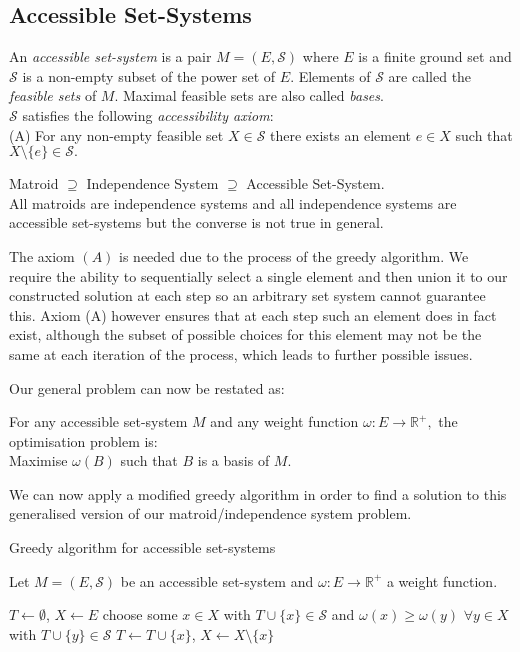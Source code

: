 \documentclass[../main.tex]{subfiles}
\begin{document}
\subsection{Accessible Set-Systems}
\begin{defn}
An \textit{accessible set-system} is a pair $M=(E,\mathcal{S})$ where $E$ is a finite ground set and $\mathcal{S}$ is a non-empty subset of the power set of $E.$ Elements of $\mathcal{S}$ are called the \textit{feasible sets} of $M.$ Maximal feasible sets are also called \textit{bases}.\\
$\mathcal{S}$ satisfies the following \textit{accessibility axiom}:\\
(A) For any non-empty feasible set $X \in \mathcal{S}$ there exists an element $e \in X$ such that $X \setminus \{e\} \in \mathcal{S}.$
\end{defn}

\begin{rem}
Matroid $\supseteq$ Independence System $\supseteq$ Accessible Set-System.\\
All matroids are independence systems and all independence systems are accessible set-systems but the converse is not true in general.
\end{rem}

\noindent The axiom $(A)$ is needed due to the process of the greedy algorithm. We require the ability to sequentially select a single element and then union it to our constructed solution at each step so an arbitrary set system cannot guarantee this. Axiom (A) however ensures that at each step such an element does in fact exist, although the subset of possible choices for this element may not be the same at each iteration of the process, which leads to further possible issues.

\noindent Our general problem can now be restated as:
\begin{prop}
For any accessible set-system $M$ and any weight function $\omega:E \longrightarrow \mathbb{R^+},$ the optimisation problem is:\\
 Maximise $\omega(B)$ such that $B$ is a basis of $M.$
\end{prop}
\noindent We can now apply a modified greedy algorithm in order to find a solution to this generalised version of our matroid/independence system problem.

\begin{algorithm}[H]
\caption{Greedy algorithm for accessible set-systems}\label{modified_greedy}
Let $M=(E,\mathcal{S})$ be an accessible set-system and $\omega:E \longrightarrow \mathbb{R^+}$ a weight function.
\begin{algorithmic}[1]
\State $T \gets \emptyset$, $X \gets E$
\State choose some $x \in X$ with $T \cup \{x\} \in \mathcal{S}$ and
\State $\omega(x) \geq \omega(y)$ $\forall y \in X$ with $T \cup \{y\} \in \mathcal{S}$
\State $T \gets T \cup \{x\}$, $X \gets X \setminus \{x\}$
\EndWhile
\EndProcedure
\end{algorithmic}
\end{algorithm}
\end{document}
